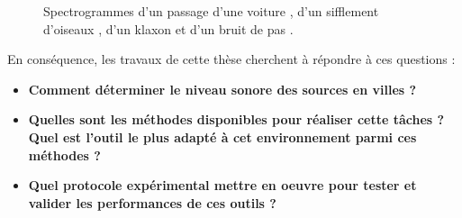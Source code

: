 \begin{figure}[t]
\centering
{}
\caption{Spectrogrammes d'un passage d'une voiture , d'un sifflement d'oiseaux , d'un klaxon  et d'un bruit de pas .}
\label{fig:sourceUrbain}
\end{figure}

En conséquence, les travaux de cette thèse cherchent à répondre à ces questions : 
\begin{itemize}
\item \textbf{Comment déterminer le niveau sonore des sources en villes ?}
\item \textbf{Quelles sont les méthodes disponibles pour réaliser cette tâches ? Quel est l'outil le plus adapté à cet environnement parmi ces méthodes ?}
\item \textbf{Quel protocole expérimental mettre en oeuvre pour tester et valider les performances de ces outils ?}
\end{itemize}


